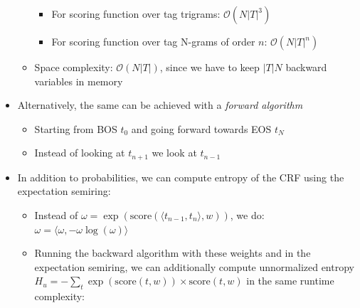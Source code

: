 \begin{itemize}
\begin{itemize}
\begin{itemize}
            \item For scoring function over tag trigrams: $\mathcal{O}(N |T|^3)$
            \item For scoring function over tag N-grams of order $n$: $\mathcal{O}(N |T|^{n})$
        \end{itemize}
        \item Space complexity: $\mathcal{O}(N|T|)$, since we have to keep $|T| N$ backward variables in memory
    \end{itemize}
    \item Alternatively, the same can be achieved with a \emph{forward algorithm}
    \begin{itemize}
        \item Starting from BOS $t_0$ and going forward towards EOS $t_N$
        \item Instead of looking at $t_{n+1}$ we look at $t_{n-1}$
    \end{itemize}
    \item In addition to probabilities, we can compute entropy of the CRF using the expectation semiring:
    \begin{itemize}
        \item Instead of $\omega = \exp(\textrm{score}(\langle t_{n-1}, t_n \rangle, w))$, we do:
        $
        \omega = \langle \omega, -\omega \log(\omega) \rangle
        $
        \item Running the backward algorithm with these weights and in the expectation semiring, we can additionally compute unnormalized entropy $H_u = - \sum_t \exp(\textrm{score}(t, w)) \times \textrm{score}(t, w)$ in the same runtime complexity:
\end{itemize}
\end{itemize}
